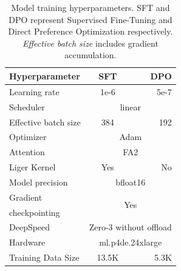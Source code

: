 \begin{table}[ht]
  \centering
  \begin{tabular}{lcr}
    \hline
    \textbf{Hyperparameter} & \textbf{SFT} & \textbf{DPO} \\ \hline
    Learning rate & 1e-6 & 5e-7 \\
    Scheduler & \multicolumn{2}{c}{linear} \\
    Effective batch size & 384 & 192 \\
    Optimizer & \multicolumn{2}{c}{Adam} \\
    Attention & \multicolumn{2}{c}{FA2} \\
    Liger Kernel & Yes & No \\
    Model precision & \multicolumn{2}{c}{bfloat16} \\
    Gradient & \multicolumn{2}{c}{\multirow{2}{*}{Yes}} \\
    checkpointing & \\
    DeepSpeed & \multicolumn{2}{c}{Zero-3 without offload} \\
    Hardware & \multicolumn{2}{c}{ml.p4de.24xlarge} \\ 
    Training Data Size & 13.5K & 5.3K \\ \hline
  \end{tabular}
  \caption{\label{table:hyperparameter}
    Model training hyperparameters. SFT and DPO represent Supervised Fine-Tuning and Direct Preference Optimization respectively. \textit{Effective batch size} includes gradient accumulation.
  }
\end{table}